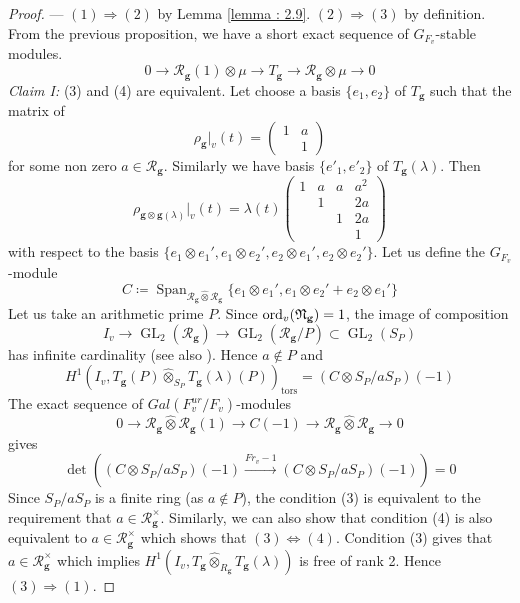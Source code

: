 \documentclass[10pt]{amsart}
\numberwithin{equation}{section}
\theoremstyle{definition}
\theoremstyle{remark} %
\newcommand{\GL}[1]{\operatorname{GL}_{#1}}
\DeclareMathOperator{\ord}{ord}
\newcommand{\g}{\mathbf{g}}
\newcommand{\R}{\mathcal{R}}
\begin{document}
	\begin{proof}
		--- \newline	
		$ (1) \Rightarrow (2) $ by Lemma \ref{lemma : 2.9}. \newline
		$ (2) \Rightarrow (3)  $ by definition. \newline	
		From the previous proposition, we have a short exact sequence of $ G_{F_v} $-stable modules.
		$$ 0 \rightarrow \R_{\g}(1) \otimes \mu \rightarrow T_\g \rightarrow \R_{\g} \otimes \mu \rightarrow 0 $$
		\textit{Claim I:} (3) and (4) are equivalent.  
		Let choose a basis $ \{e_1, e_2\} $ of $ T_\g $ such that the matrix of 
		$$ \rho_\g|_{v}(t) =
		\begin{pmatrix}
			1 &a\\
			&1	
		\end{pmatrix} $$
		for some non zero $ a \in \R_{\g} $. Similarly we have basis $ \{e'_1, e'_2\} $ of $ T_\g(\lambda) $. Then 
		\begin{equation}
			\rho_{\g \otimes \g(\lambda)}|_{v}(t) = \lambda(t)
			\begin{pmatrix}
				1 &a &a &a^2\\
				&1 &  &2a\\
				&  &1 &2a\\
				&  &  &1
			\end{pmatrix}
		\end{equation} 
		with respect to the basis $ \{e_1 \otimes e_1',e_1 \otimes e_2',e_2 \otimes e_1',e_2 \otimes e_2' \} $. Let us define the $ G_{F_v} $-module 
		$$ C\coloneqq \operatorname{Span}_{\R_{\g} \widehat{\otimes} \R_{\g}}\{e_1 \otimes e_1',e_1 \otimes e_2'+e_2 \otimes e_1'\} $$
		Let us take an arithmetic prime $P$. Since $\ord_{v} (\frak{N}_\g ) = 1$, the image of composition
		$$ I_{v} \rightarrow \GL{2}(\R_{\g}) \rightarrow \GL{2}(\R_{\g}/P) \subset \GL{2}(S_P) $$
		has infinite cardinality (see also \cite[.4.2,.14.1]{Nek06}). Hence $ a \notin P $ and 
		$$ H^1(I_{v}, T_\g(P) \widehat{\otimes}_{S_{P}} T_\g(\lambda)(P))_{\mathrm{tors}} = (C \otimes S_{P}/aS_{P})(-1) $$
		The exact sequence of $ Gal(F_{v}^{ur}/F_{v}) $-modules
		$$ 0 \rightarrow \R_{\g} \widehat{\otimes} \R_{\g}(1) \rightarrow C(-1 ) \rightarrow \R_{\g} \widehat{\otimes} \R_{\g} \rightarrow 0 $$ gives 
		$$ \det((C \otimes S_{P}/aS_{P})(-1) \xrightarrow{Fr_{v}-1} (C \otimes S_{P}/aS_{P})(-1)) =0 $$
		Since $S_{P}/aS_{P}$ is a finite ring (as $a \notin P$), the condition (3) is equivalent to the requirement that $a \in \R_\g^{\times}$. \newline
		Similarly, we can also show that condition (4) is also equivalent to $a \in \R_\g^{\times}$ which shows that $(3) \Longleftrightarrow (4)$. \newline
		Condition (3) gives that $a \in \R_\g^{\times}$ which implies $H^1(I_{v}, T_\g \widehat{\otimes}_{R_\g} T_\g (\lambda)) $ is free of rank 2. Hence $(3) \Rightarrow (1)$.
	\end{proof}
\end{document}
